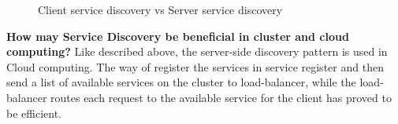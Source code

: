 \begin{figure}[bth]
	\centering
	\qquad
	\caption{Client service discovery vs Server service discovery }
	\label{fig:ClienServerService}
\end{figure}



\textbf{How may Service Discovery be beneficial in cluster and cloud computing?}  
Like described above, the server-side discovery pattern is used in Cloud computing. The way of register the services in service register and then send a list of available services on the cluster to load-balancer, while the load-balancer routes each request to the available service for the client has proved to be efficient.   
